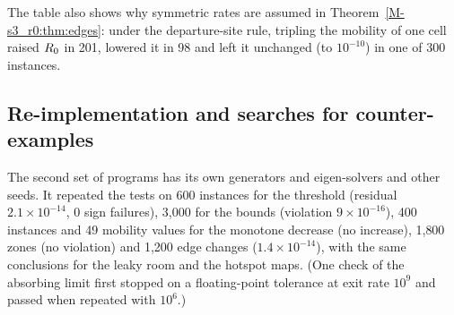The table also shows why symmetric rates are assumed in Theorem~\ref{M-s3_r0:thm:edges}: under the
departure-site rule, tripling the mobility of one cell raised $R_0$ in 201, lowered it in 98 and left it unchanged (to $10^{-10}$) in one of 300
instances.

\subsection{Re-implementation and searches for counter-examples}
\label{appA_numerics:sec:adversarial}

The second set of programs has its own generators and eigen-solvers and other seeds. It repeated the tests on
600 instances for the threshold (residual $2.1\times10^{-14}$, 0 sign failures), 3{,}000 for the bounds
(violation $9\times10^{-16}$), 400 instances and 49 mobility values for the monotone decrease (no increase),
1{,}800 zones (no violation) and 1{,}200 edge changes ($1.4\times10^{-14}$), with the same conclusions for the
leaky room and the hotspot maps.
(One check of the absorbing limit first stopped on a floating-point tolerance at exit rate $10^{9}$ and passed
when repeated with $10^{6}$.)

